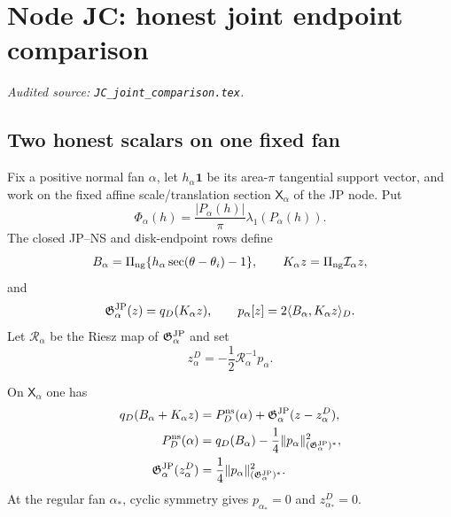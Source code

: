 \begingroup
\section{Node JC: honest joint endpoint comparison}
\label{module:JC}
\noindent\textit{Audited source: \nolinkurl{JC_joint_comparison.tex}.}
\subsection{Two honest scalars on one fixed fan}

Fix a positive normal fan $\alpha$, let $h_\alpha\mathbf1$ be its
area-$\pi$ tangential support vector, and work on the fixed affine
scale/translation section $\mathsf X_\alpha$ of the JP node.  Put
\begin{equation}\label{JC:eq:polygon-scalar}
 \Phi_\alpha(h)=\frac{|P_\alpha(h)|}{\pi}
                    \lambda_1(P_\alpha(h)).
\end{equation}
The closed JP--NS and disk-endpoint rows define
\begin{equation}\label{JC:eq:disk-data}
 B_\alpha=\Pi_{\rm ng}
 \{h_\alpha\sec(\theta-\theta_i)-1\},\qquad
 K_\alpha z=\Pi_{\rm ng}\mathcal I_\alpha z,
\end{equation}
and
\begin{equation}\label{JC:eq:metric-forcing}
 \mathfrak G^{\rm JP}_\alpha(z)=q_D(K_\alpha z),\qquad
 p_\alpha[z]=2\langle B_\alpha,K_\alpha z\rangle_D.
\end{equation}
Let $\mathcal R_\alpha$ be the Riesz map of $\mathfrak G^{\rm JP}_\alpha$ and set
\begin{equation}\label{JC:eq:disk-corrector}
 z_\alpha^D=-\frac12\mathcal R_\alpha^{-1}p_\alpha.
\end{equation}

\begin{proposition}\label{JC:prop:disk-completion}
On $\mathsf X_\alpha$ one has
\begin{align}
 q_D(B_\alpha+K_\alpha z)
 &=P_D^{\rm ns}(\alpha)
   +\mathfrak G^{\rm JP}_\alpha(z-z_\alpha^D),\label{JC:eq:disk-completion}\\
 P_D^{\rm ns}(\alpha)
 &=q_D(B_\alpha)-\frac14
       \|p_\alpha\|_{(\mathfrak G^{\rm JP}_\alpha)^*}^2,\label{JC:eq:disk-schur}\\
 \mathfrak G^{\rm JP}_\alpha(z_\alpha^D)
 &=\frac14\|p_\alpha\|_{(\mathfrak G^{\rm JP}_\alpha)^*}^2.
 \label{JC:eq:corrector-size}
\end{align}
At the regular fan $\alpha_*$, cyclic symmetry gives
$p_{\alpha_*}=0$ and $z_{\alpha_*}^D=0$.
\end{proposition}

